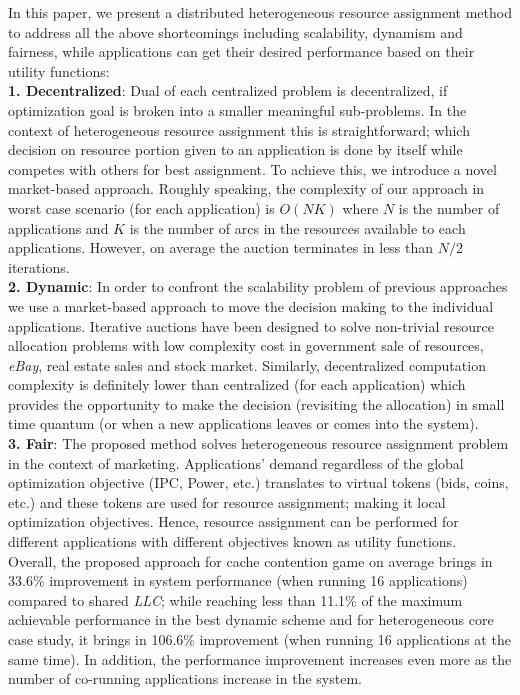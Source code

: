 \indent In this paper, we present a distributed heterogeneous resource assignment method to address all the above shortcomings including scalability, dynamism and fairness, while applications can get their desired performance based on their utility functions:\\
\indent \textbf{1. Decentralized}: Dual of each centralized problem is decentralized, if optimization goal is broken into a smaller meaningful sub-problems. In the context of heterogeneous resource assignment this is straightforward; which decision on resource portion given to an application is done by itself while competes with others for best assignment. To achieve this, we introduce a novel market-based approach. Roughly speaking, the complexity of our approach in worst case scenario (for each application) is $O(NK)$ where $N$ is the number of applications and $K$ is the number of arcs in the resources available to each applications. However, on average the auction terminates in less than $N/2$ iterations.\\
\indent \textbf{2. Dynamic}: In order to confront the scalability problem of previous approaches we use a market-based approach to move the decision making to the individual applications. Iterative auctions have been designed to solve non-trivial resource allocation problems with low complexity cost in government sale of resources, \textit{eBay}, real estate sales and stock market. Similarly, decentralized computation complexity is definitely lower than centralized (for each application) which provides the opportunity to make the decision (revisiting the allocation) in small time quantum (or when a new applications leaves or comes into the system).\\
\indent \textbf{3. Fair}: The proposed method solves heterogeneous resource assignment problem in the context of marketing. Applications' demand regardless of the global optimization objective (IPC, Power, etc.) translates to virtual tokens (bids, coins, etc.) and these tokens are used for resource assignment; making it local optimization objectives. Hence, resource assignment can be performed for different applications with different objectives known as utility functions.\\
\indent Overall, the proposed approach for cache contention game on average brings in 33.6\% improvement in system performance (when running 16 applications) compared to shared \textit{LLC}; while reaching less than 11.1\% of the maximum achievable performance in the best dynamic scheme and for heterogeneous core case study, it brings in 106.6\% improvement (when running 16 applications at the same time). In addition, the performance improvement increases even more as the number of co-running applications increase in the system. \\
